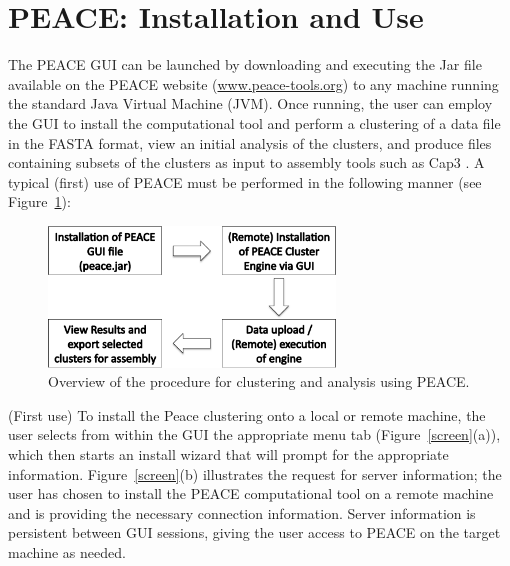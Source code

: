 \documentclass[a4,center,fleqn]{NAR}
\newcommand{\peace} {{\small PEACE}}
\begin{document}
\enlargethispage{-65.1pt}

\section{\peace\/: Installation and Use}

The \peace\/ GUI can be launched by downloading and executing the
Jar file available on the \peace\/ website
(\href{http://www.peace-tools.org}{www.peace-tools.org}) to any
machine running the standard Java Virtual Machine (JVM).  Once
running, the user can employ the GUI to install the computational tool
and perform a clustering of a data file in the FASTA format, view an
initial analysis of the clusters, and produce files containing subsets
of the clusters as input to assembly tools such as {\sc Cap3}
\cite{Huang99}.  A typical (first) use of \peace\/ must be
performed in the following manner (see Figure~\ref{fig:workflow}):

\begin{figure}
  \centerline{\includegraphics[width=3in]{screen.d/workflow.pdf}}
  \caption{Overview of the procedure for clustering and analysis using
    PEACE.}\label{fig:workflow}
\end{figure}


 (First use) To install the {\sc
  Peace} clustering onto a local or remote machine, the user selects
from within the GUI the appropriate menu tab (Figure~\ref{screen}(a)),
which then starts an install wizard that will prompt for the
appropriate information.  Figure~\ref{screen}(b) illustrates the
request for server information; the user has chosen to install the
\peace\/ computational tool on a remote machine and is providing
the necessary connection information.  Server information is
persistent between GUI sessions, giving the user access to \peace\/
on the target machine as needed.
\end{document}

